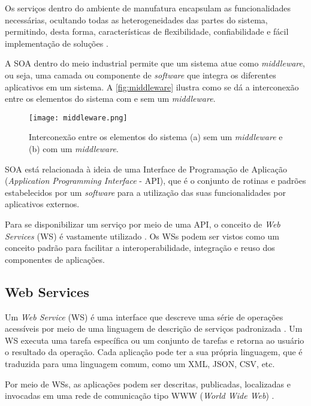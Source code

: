 Os serviços dentro do ambiente de manufatura encapsulam as funcionalidades necessárias, ocultando todas as heterogeneidades das partes do sistema, permitindo, desta forma, características de flexibilidade, confiabilidade e fácil implementação de	soluções \cite{groba2008soa}.

A SOA dentro do meio industrial permite que um sistema atue como \textit{middleware}, ou seja, uma camada ou componente de \textit{software} que integra os diferentes aplicativos em um sistema. A \autoref{fig:middleware} ilustra como se dá a interconexão entre os elementos do sistema com e sem um \textit{middleware}.

\begin{figure}[htb]
	\centering
	\texttt{[image: middleware.png]}
	\caption{Interconexão entre os elementos do sistema (a) sem um \textit{middleware} e (b) com um \textit{middleware}.}
	\label{fig:middleware}
\end{figure}

SOA está relacionada à ideia de uma Interface de Programação de Aplicação (\textit{Application Programming Interface} - API), que é o conjunto de rotinas e padrões estabelecidos por um \textit{software} para a utilização das suas funcionalidades por aplicativos externos.

Para se disponibilizar um serviço por meio de uma API, o conceito de \textit{Web Services} (WS) é vastamente utilizado \cite{souit2013soa}. Os WSs podem ser vistos como um conceito padrão para facilitar a interoperabilidade, integração e reuso dos componentes de aplicações.

\subsection{Web Services}

Um \textit{Web Service} (WS) é uma interface que descreve uma série de operações acessíveis por meio de uma linguagem de descrição de serviços padronizada \cite{gottschalk2002webservices}. Um WS executa uma tarefa específica ou um conjunto de tarefas e retorna ao usuário o resultado da operação. Cada aplicação pode ter a sua própria linguagem, que é traduzida para uma linguagem comum, como um XML, JSON, CSV, etc.

Por meio de WSs, as aplicações podem ser descritas, publicadas, localizadas e invocadas em uma rede de comunicação tipo WWW (\textit{World Wide Web}) \cite{souit2013soa}.


